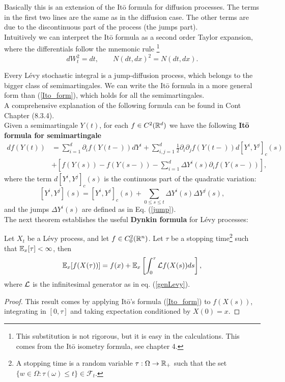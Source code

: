  Basically this is an extension of the It\={o} formula for diffusion processes. The terms in the first two lines are the same as in
 the diffusion case. The other terms are due to the discontinuous part of the process (the jumps part).\\
 Intuitively we can interpret the It\={o} formula as a second order Taylor expansion, where the differentials follow the mnemonic rule
 \footnote{This substitution is not rigorous, but it is easy in the calculations. This comes from the It\={o} isometry formula, see
 \cite{Applebaum} chapter 4.}
\begin{equation}
 dW_t^2 = dt, \hspace{2em} N(dt,dx)^2=N(dt,dx). 
\end{equation}

Every Lévy stochastic integral is a jump-diffusion process, which belongs to the bigger class of semimartingales.
We can write the It\={o} formula in a more general form than (\ref{Ito_form}), which holds for all the semimartingales.\\
A comprehensive explanation of the following formula can be found in Cont \cite{Cont} Chapter (8.3.4).\\
Given a semimartingale $Y(t)$, for each $f\in C^2(\mathbb{R}^d)$ we have the following 
\textbf{It\={o} formula for semimartingale}
\begin{align} \label{Ito_semi}
 df(Y(t)) &= \sum_{i=1}^d \partial_if(Y(t-)) dY^i  
 + \sum_{i,j=1} ^d \frac{1}{2} \partial_i\partial_jf(Y(t-)) d[Y^i,Y^j]_c(s) \\ 
          &+ \left[f(Y(s)) - f(Y(s-)) - \sum_{i=1}^d \Delta Y^i(s)\partial_i f(Y(s-))  \right], \nonumber
\end{align} %
where the term $d[Y^i,Y^j]_c(s)$ is the continuous part of the quadratic variation:
$$ [Y^i,Y^j](s) = [Y^i,Y^j]_c(s) + \sum_{0\leq s \leq t} \Delta Y^i(s) \Delta Y^j(s), $$
and the jumps $\Delta Y^i(s)$ are defined as in Eq. (\ref{jump}).\\

The next theorem establishes the useful \textbf{Dynkin formula} for Lévy processes:
\begin{Theorem}
 Let $X_t$ be a Lévy process, and let $f\in C_0^2(\mathbb{R}^n)$. Let $\tau$ be a stopping time\footnote{A stopping time is a random
 variable $\tau : \Omega \to \mathbb{R}_+$ such that the set $\{w\in\Omega : \tau(\omega) \leq t\} \in \mathcal{F}_t$.} such that
 $\mathbb{E}_x[\tau] < \infty$, then
 \begin{equation}\label{Dynkin_formula}
  \mathbb{E}_x[f(X(\tau))] = f(x) +\mathbb{E}_x\left[ \int_0^{\tau} \mathcal{L} f(X(s))ds \right],
 \end{equation}
 where $\mathcal{L}$ is the infinitesimal generator as in eq. (\ref{genLevy}).
\end{Theorem}
\begin{proof}
 This result comes by applying It\={o}'s formula (\ref{Ito_form}) to $f(X(s))$, integrating in $[0,\tau]$ and taking 
 expectation conditioned by $X(0)=x$.
\end{proof}

